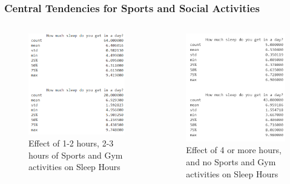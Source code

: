 \documentclass[11pt,]{beamer}
\begin{document}
\begin{frame}

    
	\frametitle{Central Tendencies for Sports and Social Activities}
	
	\begin{columns}[c]
	
	\begin{column}{.5\textwidth}
    	\begin{figure}
    		\includegraphics[width=6cm]{DF_List_3.png}
    		\caption{
    		\tiny{Effect of 1-2 hours, 2-3 hours of Sports and Gym activities on Sleep Hours} 
    		}
    	\end{figure}
	\end{column}

    \begin{column}{.5\textwidth}
    	\begin{figure}
    		\includegraphics[width=6cm]{DF_List_4.png}
    		\caption{
    	    \tiny{Effect of 4 or more hours, and no Sports and Gym activities on Sleep Hours}
    		}
    	\end{figure}
	\end{column}
	
    \end{columns}
	
\end{frame}
\end{document}
